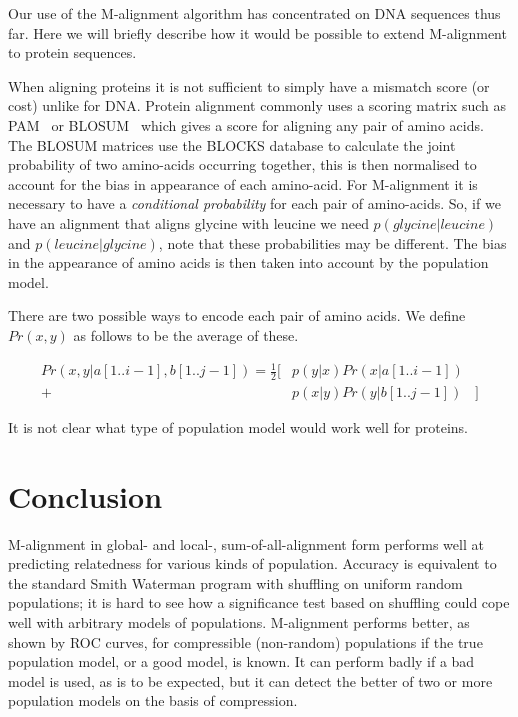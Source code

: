 \documentclass[letterpaper,11pt,oneside]{article}
\begin{document}
\begin{multicols}{2}
Our use of the M-alignment algorithm has concentrated on DNA sequences thus
far.  Here we will briefly describe how it would be possible to extend
M-alignment to protein sequences.

When aligning proteins it is not sufficient to simply have a mismatch score
(or cost) unlike for DNA.  Protein alignment commonly uses a scoring matrix
such as PAM~\cite{dayhoff78} or BLOSUM~\cite{henikoff92} which gives a score
for aligning any pair of amino acids.  The BLOSUM matrices use the BLOCKS
database to calculate the joint probability of two amino-acids occurring
together, this is then normalised to account for the bias in appearance of
each amino-acid.  For M-alignment it is necessary to have a {\em conditional
probability} for each pair of amino-acids.  So, if we have an alignment that
aligns glycine with leucine we need $p(glycine | leucine)$ and $p(leucine |
glycine)$, note that these probabilities may be different.  The bias in the
appearance of amino acids is then taken into account by the population model.

There are two possible ways to encode each pair of amino acids.  We define
$Pr(x,y)$ as follows to be the average of these.

{
\small
\setlength{\arraycolsep}{0pt}
\begin{eqnarray*}
Pr(x,y | a[1..i-1],b[1..j-1] ) = \frac{1}{2}
[ & p(y|x) Pr(x | a[1..i-1]) & \\
+ & p(x|y) Pr(y | b[1..j-1]) & ]
\end{eqnarray*}
}

It is not clear what type of population model would work well for proteins.

\section{Conclusion} \label{sec:conc}

M-alignment in global- and local-, sum-of-all-alignment form performs well
at predicting relatedness for various kinds of population.
Accuracy is equivalent to the standard Smith Waterman program with shuffling
on uniform random populations;
it is hard to see how a significance test based on shuffling could
cope well with arbitrary models of populations.
M-alignment performs better, as shown by ROC curves,
for compressible (non-random) populations if the true
population model, or a good model, is known.
It can perform badly if a bad model is used, as is to be expected,
but it can detect the better of two or more population models
on the basis of compression.


\end{multicols}
\end{document}
